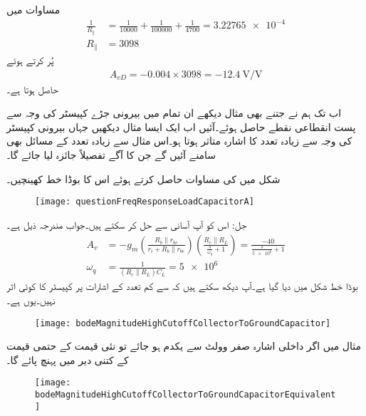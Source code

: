 مساوات  میں
\begin{align*}
\frac{1}{R_{\mathbin{\|}}}&=\frac{1}{10000}+\frac{1}{100000}+\frac{1}{4700}=\num{3.22765e-4}\\
R_{\mathbin{\|}}&=\num{3098}
\end{align*}
پُر کرتے ہوئے
\begin{align*}
A_{vD}=-0.004 \times 3098=\SI{-12.4}{\volt \per \volt}
\end{align*}
حاصل ہوتا ہے۔


اب تک ہم نے جتنے بھی مثال دیکھے ان تمام میں بیرونی جڑے کپیسٹر کی وجہ سے پست انقطاعی نقطے  حاصل ہوئے۔آئیں اب ایک ایسا مثال دیکھیں جہاں بیرونی کپیسٹر کی وجہ سے زیادہ تعدد کا اشارہ متاثر ہوتا ہو۔اس مثال سے زیادہ تعدد کے مسائل بھی سامنے آئیں گے جن کا آگے تفصیلاً جائزہ لیا جائے گا۔

شکل  میں  کی مساوات حاصل کرتے ہوئے اس کا بوڈا خط کھینچیں۔
\begin{figure}
\centering
\texttt{[image: questionFreqResponseLoadCapacitorA]}
\caption{}
\label{شکل_تعددی_ردعمل_سوال_بار_کپیسٹر_الف}
\end{figure}

جل: اس کو آپ آسانی سے حل کر سکتے ہیں۔جواب مندرجہ ذیل ہے۔ 
\begin{align*}
A_v&= - g_m \left(\frac{R_b \mathbin{\|} r_{be}}{r_i+R_b \mathbin{\|} r_{be}} \right) \left(\frac{R_c \mathbin{\|} R_L  }{\frac{s}{\omega_q}+1}\right) = \frac{-40}{\frac{s}{\num{5e6}}+1}\\
\omega_q&=\tfrac{1}{\left(R_c \mathbin{\|} R_L \right) C_L}=\num{5e6}
\end{align*}
%
بوڈا خط شکل  میں دیا گیا ہے۔آپ دیکھ سکتے ہیں کہ  سے کم تعدد کے اشارات پر کپیسٹر کا کوئی اثر نہیں۔یوں   ہے۔
\begin{figure}
\centering
\texttt{[image: bodeMagnitudeHighCutoffCollectorToGroundCapacitor]}
\caption{}
\label{شکل_تعددی_ردعمل_سوال_زمین_تک_کپیسٹر}
\end{figure}
مثال  میں اگر داخلی اشارہ صفر وولٹ سے یکدم  ہو جائے تو  نئی قیمت کے حتمی قیمت کے  کتنی دیر میں پہنچ پائے گا۔
\begin{figure}
\centering
\texttt{[image: bodeMagnitudeHighCutoffCollectorToGroundCapacitorEquivalent]}
\caption{}
\label{شکل_تعددی_ردعمل_سوال_زمین_تک_کپیسٹر_مساوی_دور}
\end{figure}

